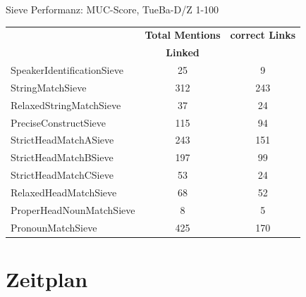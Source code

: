 \documentclass[11pt,a4paper]{beamer}
\begin{document}
\begin{frame}{Sieve Performanz: MUC-Score, TueBa-D/Z 1-100}
\begin{table}[h]
\begin{tabular}{l||c|c}
                           & \textbf{Total Mentions} & \textbf{correct Links} \\
                          &\textbf{Linked}			&\\ \hline
SpeakerIdentificationSieve & 25                             & 9                      \\
StringMatchSieve           & 312                            & 243   					\\
RelaxedStringMatchSieve    & 37                             & 24                     \\
PreciseConstructSieve      & 115                            & 94                     \\
StrictHeadMatchASieve      & 243                            & 151                    \\
StrictHeadMatchBSieve      & 197                            & 99                     \\
StrictHeadMatchCSieve      & 53                             & 24                     \\
RelaxedHeadMatchSieve      & 68                             & 52                     \\
ProperHeadNounMatchSieve   & 8                              & 5                      \\
PronounMatchSieve          & 425                            & 170                    \\
\end{tabular}
\end{table}
\end{frame}



  

\section{Zeitplan}
\end{document}
